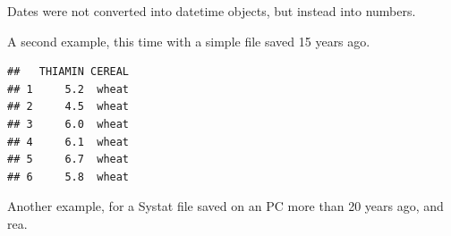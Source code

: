 \documentclass[krantz2]{krantz}\usepackage{knitr}%
\begin{document}
Dates were not converted into \Rlang datetime objects, but instead into numbers.

A second example, this time with a simple  file saved 15 years ago.

\begin{knitrout}\footnotesize
{}\color{fgcolor}\begin{kframe}
\begin{alltt}
 \hlkwb{<-} \hlstd{(} \hlstd{=} \hlstd{,}  \hlstd{=} \hlstd{)}
\end{alltt}
\begin{verbatim}
##   THIAMIN CEREAL
## 1     5.2  wheat
## 2     4.5  wheat
## 3     6.0  wheat
## 4     6.1  wheat
## 5     6.7  wheat
## 6     5.8  wheat
\end{verbatim}
\end{kframe}
\end{knitrout}

Another example, for a Systat file saved on an PC more than 20 years ago, and rea.
\end{document}
